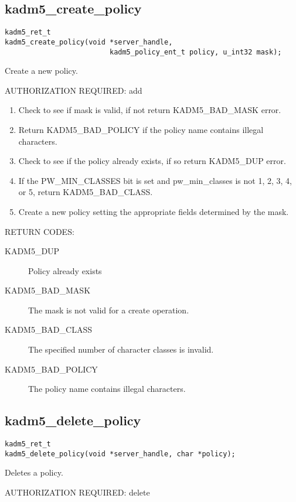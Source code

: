 \subsection{kadm5_create_policy}

\begin{verbatim}
kadm5_ret_t
kadm5_create_policy(void *server_handle,
                         kadm5_policy_ent_t policy, u_int32 mask); 
\end{verbatim}

Create a new policy.

AUTHORIZATION REQUIRED: add

\begin{enumerate}
\item Check to see if mask is valid, if not return KADM5_BAD_MASK error.
\item Return KADM5_BAD_POLICY if the policy name contains illegal
characters.

\item Check to see if the policy already exists, if so return
KADM5_DUP error. 
\item If the PW_MIN_CLASSES bit is set and pw_min_classes is not 1, 2,
3, 4, or 5, return KADM5_BAD_CLASS.
\item Create a new policy setting the appropriate fields determined
by the mask.
\end{enumerate}

RETURN CODES:

\begin{description}
\item[KADM5_DUP] Policy already exists
\item[KADM5_BAD_MASK] The mask is not valid for a create
operation.
\item[KADM5_BAD_CLASS] The specified number of character classes
is invalid.
\item[KADM5_BAD_POLICY] The policy name contains illegal characters.
\end{description}

\subsection{kadm5_delete_policy}

\begin{verbatim}
kadm5_ret_t
kadm5_delete_policy(void *server_handle, char *policy);
\end{verbatim}

Deletes a policy.

AUTHORIZATION REQUIRED: delete

